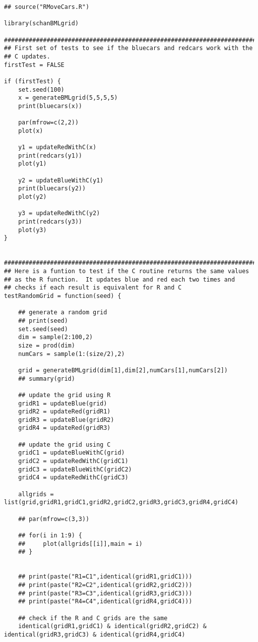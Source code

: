 \documentclass[11pt]{article}
\begin{document}
\begin{verbatim}
## source("RMoveCars.R")

library(schanBMLgrid)

#########################################################################
## First set of tests to see if the bluecars and redcars work with the
## C updates.
firstTest = FALSE

if (firstTest) {
    set.seed(100)
    x = generateBMLgrid(5,5,5,5)
    print(bluecars(x))

    par(mfrow=c(2,2))
    plot(x)

    y1 = updateRedWithC(x)
    print(redcars(y1))
    plot(y1)

    y2 = updateBlueWithC(y1)
    print(bluecars(y2))
    plot(y2)

    y3 = updateRedWithC(y2)
    print(redcars(y3))
    plot(y3)
}


#########################################################################
## Here is a funtion to test if the C routine returns the same values
## as the R function.  It updates blue and red each two times and
## checks if each result is equivalent for R and C
testRandomGrid = function(seed) {

    ## generate a random grid
    ## print(seed)
    set.seed(seed)
    dim = sample(2:100,2)
    size = prod(dim)
    numCars = sample(1:(size/2),2)

    grid = generateBMLgrid(dim[1],dim[2],numCars[1],numCars[2])
    ## summary(grid)

    ## update the grid using R
    gridR1 = updateBlue(grid)
    gridR2 = updateRed(gridR1)
    gridR3 = updateBlue(gridR2)
    gridR4 = updateRed(gridR3)

    ## update the grid using C
    gridC1 = updateBlueWithC(grid)
    gridC2 = updateRedWithC(gridC1)
    gridC3 = updateBlueWithC(gridC2)
    gridC4 = updateRedWithC(gridC3)

    allgrids = list(grid,gridR1,gridC1,gridR2,gridC2,gridR3,gridC3,gridR4,gridC4)

    ## par(mfrow=c(3,3))

    ## for(i in 1:9) {
    ##     plot(allgrids[[i]],main = i)
    ## }


    ## print(paste("R1=C1",identical(gridR1,gridC1)))
    ## print(paste("R2=C2",identical(gridR2,gridC2)))
    ## print(paste("R3=C3",identical(gridR3,gridC3)))
    ## print(paste("R4=C4",identical(gridR4,gridC4)))

    ## check if the R and C grids are the same
    identical(gridR1,gridC1) & identical(gridR2,gridC2) & identical(gridR3,gridC3) & identical(gridR4,gridC4)


\end{verbatim}
\end{document}
